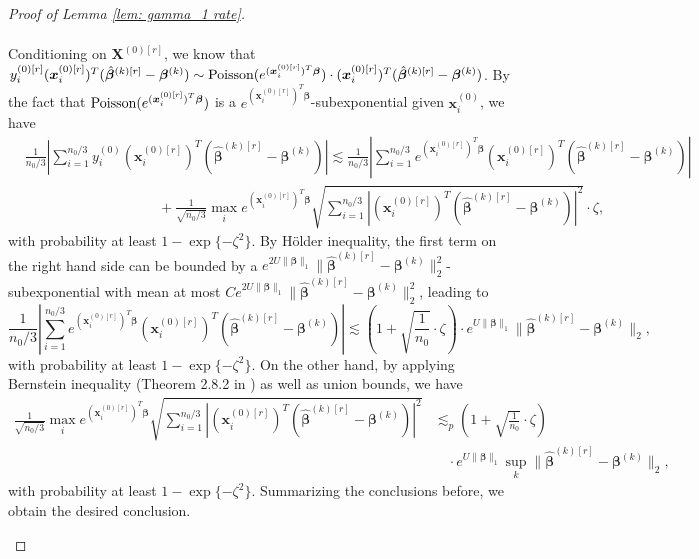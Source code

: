 \documentclass[12pt]{article}
\newcommand{\twonorm}[1]{\|#1\|_{2}}
\newcommand{\onenorm}[1]{\|#1\|_{1}}
\newcommand{\norma}[1]{\left|#1\right|}
\newcommand{\norm}[1]{|#1|}
\newcommand{\bbeta}{\bm{\beta}}
\newcommand{\hbeta}{\hat{\bm{\beta}}}
\newcommand{\bbetak}[1]{\bm{\beta}^{(#1)}}
\newcommand{\bx}{\bm{x}}
\newcommand{\bxk}[1]{\bm{x}^{(#1)}}
\newcommand{\bX}{\bm{X}}
\newcommand{\<}{\langle}
\renewcommand{\>}{\rangle}
\begin{document}
\begin{proof}[Proof of Lemma \ref{lem: gamma_1 rate}]
\begin{enumerate}[(i)]
\begin{align}
		\end{align}
		Conditioning on $\bX^{(0)[r]}$, we know that $y_i^{(0)[r]}(\bx^{(0)[r]}_i)^T(\hbeta^{(k)[r]}-\bbetak{k}) \sim \textup{Poisson}(e^{(\bx^{(0)[r]}_i)^T\bbeta}) \cdot (\bx^{(0)[r]}_i)^T(\hbeta^{(k)[r]}-\bbetak{k})$. By the fact that $\textup{Poisson}(e^{(\bx^{(0)[r]}_i)^T\bbeta})$ is a $e^{(\bx^{(0)[r]}_i)^T\bbeta}$-subexponential given $\bxk{0}_i$, we have
		\begin{align}
			&\frac{1}{n_0/3}\norma{\sum_{i=1}^{n_0/3}y_i^{(0)}(\bx^{(0)[r]}_i)^T(\hbeta^{(k)[r]}-\bbetak{k})} \lesssim \frac{1}{n_0/3}\norma{\sum_{i=1}^{n_0/3}e^{(\bx^{(0)[r]}_i)^T\bbeta}(\bx^{(0)[r]}_i)^T(\hbeta^{(k)[r]}-\bbetak{k})} \\
			&\hspace{4cm} + \frac{1}{\sqrt{n_0/3}}\max_i e^{(\bx^{(0)[r]}_i)^T\bbeta}\sqrt{\sum_{i=1}^{n_0/3}\norm{(\bx^{(0)[r]}_i)^T(\hbeta^{(k)[r]}-\bbetak{k})}^2}\cdot \zeta,
		\end{align}
		with probability at least $1-\exp\{-\zeta^2\}$.
		By H\"older inequality, the first term on the right hand side can be bounded by a $e^{2U\onenorm{\bbeta}}\twonorm{\hbeta^{(k)[r]}-\bbetak{k}}^2$-subexponential with mean at most $Ce^{2U\onenorm{\bbeta}}\twonorm{\hbeta^{(k)[r]}-\bbetak{k}}^2$, leading to
		\begin{equation}
			\frac{1}{n_0/3}\norma{\sum_{i=1}^{n_0/3}e^{(\bx^{(0)[r]}_i)^T\bbeta}(\bx^{(0)[r]}_i)^T(\hbeta^{(k)[r]}-\bbetak{k})} \lesssim \left(1+\sqrt{\frac{1}{n_0}}\cdot \zeta\right)\cdot e^{U\onenorm{\bbeta}}\twonorm{\hbeta^{(k)[r]}-\bbetak{k}},
		\end{equation}
		with probability at least $1-\exp\{-\zeta^2\}$.
		On the other hand, by applying Bernstein inequality (Theorem 2.8.2 in \cite{vershynin2018high}) as well as union bounds, we have
		\begin{align}
			\frac{1}{\sqrt{n_0/3}}\max_i e^{(\bx^{(0)[r]}_i)^T\bbeta}\sqrt{\sum_{i=1}^{n_0/3}\norm{(\bx^{(0)[r]}_i)^T(\hbeta^{(k)[r]}-\bbetak{k})}^2} &\lesssim_p \left(1+\sqrt{\frac{1}{n_0}}\cdot \zeta\right)\\
			&\quad \cdot e^{U\onenorm{\bbeta}}\sup_k\twonorm{\hbeta^{(k)[r]}-\bbetak{k}},
		\end{align}
		with probability at least $1-\exp\{-\zeta^2\}$.
		Summarizing the conclusions before, we obtain the desired conclusion.
		\end{enumerate}
\end{proof}
\end{document}
